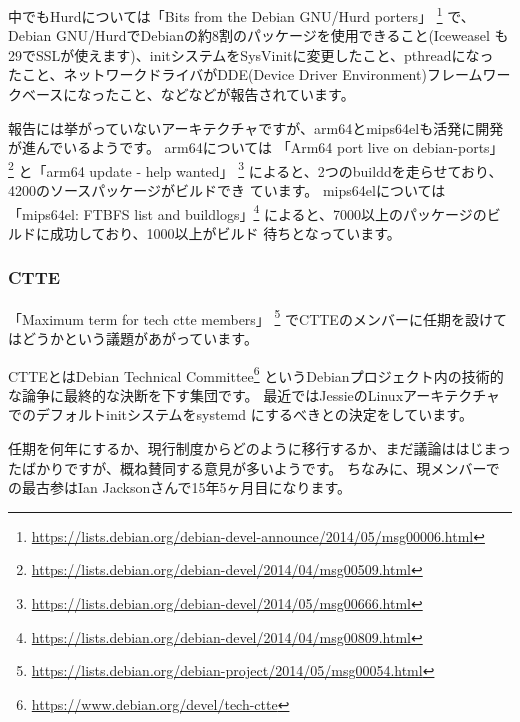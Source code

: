 \documentclass[mingoth,a4paper]{jsarticle}
\begin{document}
中でもHurdについては「Bits from the Debian GNU/Hurd porters」
\footnote{\url{https://lists.debian.org/debian-devel-announce/2014/05/msg00006.html}}
で、Debian GNU/HurdでDebianの約8割のパッケージを使用できること(Iceweasel
も29でSSLが使えます)、initシステムをSysVinitに変更したこと、pthreadになっ
たこと、ネットワークドライバがDDE(Device Driver Environment)フレームワー
クベースになったこと、などなどが報告されています。

報告には挙がっていないアーキテクチャですが、arm64とmips64elも活発に開発
が進んでいるようです。
arm64については
「Arm64 port live on debian-ports」
\footnote{\url{https://lists.debian.org/debian-devel/2014/04/msg00509.html}}
と「arm64 update - help wanted」
\footnote{\url{https://lists.debian.org/debian-devel/2014/05/msg00666.html}}
によると、2つのbuilddを走らせており、4200のソースパッケージがビルドでき
ています。
mips64elについては
「mips64el: FTBFS list and buildlogs」\footnote{\url{https://lists.debian.org/debian-devel/2014/04/msg00809.html}}
によると、7000以上のパッケージのビルドに成功しており、1000以上がビルド
待ちとなっています。

\subsubsection{CTTE}
「Maximum term for tech ctte members」
\footnote{\url{https://lists.debian.org/debian-project/2014/05/msg00054.html}}
でCTTEのメンバーに任期を設けてはどうかという議題があがっています。

CTTEとはDebian Technical Committee\footnote{\url{https://www.debian.org/devel/tech-ctte}}
というDebianプロジェクト内の技術的な論争に最終的な決断を下す集団です。
最近ではJessieのLinuxアーキテクチャでのデフォルトinitシステムをsystemd
にするべきとの決定をしています。

任期を何年にするか、現行制度からどのように移行するか、まだ議論ははじまっ
たばかりですが、概ね賛同する意見が多いようです。
ちなみに、現メンバーでの最古参はIan Jacksonさんで15年5ヶ月目になります。
\end{document}
